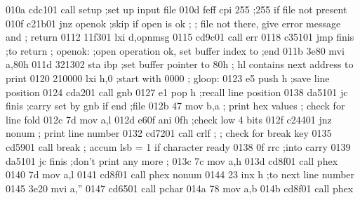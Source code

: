 010a cdc101                          call setup     ;set up input file
010d feff                            cpi  255       ;255 if file not present
010f c21b01                          jnz  openok    ;skip if open is ok
                            ;
                            ;        file not there, give error message and
                            ;        return
0112 11f301                          lxi  d,opnmsg
0115 cd9c01                          call err
0118 c35101                          jmp finis      ;to return
                            ;
                            openok:  ;open operation ok, set buffer index to
                                     ;end
011b 3e80                            mvi  a,80h
011d 321302                          sta  ibp       ;set buffer pointer to 80h
                            ;        hl contains next address to print
0120 210000                          lxi  h,0       ;start with 0000
                            ;
                            gloop:
0123 e5                              push h         ;save line position
0124 cda201                          call gnb
0127 e1                              pop  h         ;recall line position
0138 da5101                          jc   finis     ;carry set by gnb if end
                                                    ;file
012b 47                              mov  b,a
                            ;        print hex values
                            ;        check for line fold
012c 7d
                                     mov  a,l
012d e60f                            ani  0fh       ;check low 4 bits
012f c24401                          jnz nonum
                            ;        print line number
0132 cd7201                          call crlf
                            ;
                            ;        check for break key
0135 cd5901                          call break
                            ;        accum lsb = 1 if character ready
0138 0f                              rrc            ;into carry
0139 da5101                          jc   finis     ;don't print any more
                            ;
013c 7c                              mov  a,h
013d cd8f01                          call phex
0140 7d                              mov  a,l
0141 cd8f01                          call phex
                            nonum
0144 23                              inx  h         ;to next line number
0145 3e20                            mvi  a,''
0147 cd6501                          call pchar
014a 78                              mov  a,b
014b cd8f01                          call phex

